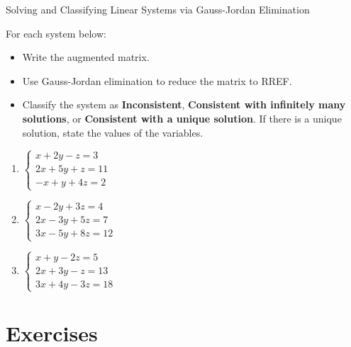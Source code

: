 \documentclass{article}
\begin{document}
\vspace{6pt}
\begin{activity} Solving and Classifying Linear Systems via Gauss-Jordan Elimination

For each system below:
\begin{itemize}
  \item Write the augmented matrix.
  \item Use Gauss-Jordan elimination to reduce the matrix to RREF.
  \item Classify the system as \textbf{Inconsistent}, \textbf{Consistent with infinitely many solutions}, or \textbf{Consistent with a unique solution}. If there is a unique solution, state the values of the variables.
\end{itemize}
\begin{enumerate}
  \item \(\begin{cases} x + 2y - z = 3 \\ 2x + 5y + z = 11 \\ -x + y + 4z = 2 \end{cases}\)
  \item \(\begin{cases} x - 2y + 3z = 4 \\ 2x - 3y + 5z = 7 \\ 3x - 5y + 8z = 12 \end{cases}\)
  \item \(\begin{cases} x + y - 2z = 5 \\ 2x + 3y - z = 13 \\ 3x + 4y - 3z = 18 \end{cases}\)
\end{enumerate}
\end{activity}

\section{Exercises}\label{sec:exercises}

\end{document}
